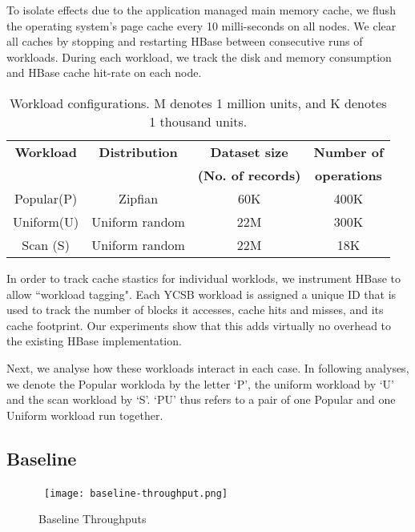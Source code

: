 \documentclass[twocolumn]{article}
\begin{document}
\begin{enumerate}
To isolate effects due to the application managed main memory cache, we flush the operating system's page cache every 10 milli-seconds on all nodes. We clear all caches by stopping and restarting HBase between consecutive runs of workloads. During each workload, we track the disk and memory consumption and HBase cache hit-rate on each node.

\begin{table*}[ht!]\footnotesize
\centering
\begin{tabular}{ | c | c | c | c |   }
  \hline
\textbf{Workload} & \textbf{Distribution} & \textbf{Dataset size} & \textbf{Number of } \\
&  & \textbf{(No. of records)} &  \textbf{operations} \\
\hline
Popular(P) & Zipfian  & 60K & 400K   \\
Uniform(U) & Uniform random & 22M & 300K \\
Scan (S) & Uniform random & 22M & 18K  \\ 
\hline
\end{tabular}
\caption{Workload configurations. M denotes 1 million units, and K denotes 1 thousand units.}  
\label{tab:workloads}
\end{table*}


\end{enumerate}

In order to track cache stastics for individual worklods, we instrument HBase to allow ``workload tagging". Each YCSB workload is assigned a unique ID that is used to track the number of blocks it accesses, cache hits and misses, and its cache footprint. Our experiments show that this adds virtually no overhead to the existing HBase implementation.

Next, we analyse how these workloads interact in each case. In following analyses, we denote the Popular workloda by the letter `P', the uniform workload by `U' and the scan workload by `S'. `PU' thus refers to a pair of one Popular and one Uniform workload run together.

\subsection{Baseline}

\begin{figure}[h!]\footnotesize
  \centering
  \mbox {
  \texttt{[image: baseline-throughput.png]}
  }
  \caption{Baseline Throughputs}
  \label{fig:baseline}
\end{figure}
\end{document}
